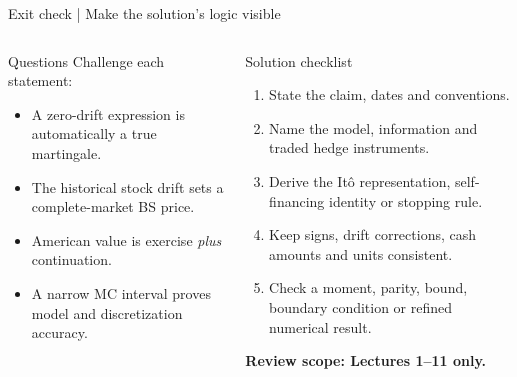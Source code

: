 \documentclass[handout,10pt,t,aspectratio=169]{beamer}
\newenvironment{questions}{\begin{block}{Questions}}{\end{block}}
\newcommand{\compact}{\small%
 \setlength{\abovedisplayskip}{3pt}%
 \setlength{\belowdisplayskip}{3pt}%
 \setlength{\abovedisplayshortskip}{2pt}%
 \setlength{\belowdisplayshortskip}{2pt}%
 \setlength{\parskip}{2pt}}
\begin{document}
\begin{frame}{Exit check | Make the solution's logic visible}
\compact
\begin{columns}[T,onlytextwidth]
\begin{questions}
Challenge each statement:
\begin{itemize}
\item A zero-drift expression is automatically a true martingale.
\item The historical stock drift sets a complete-market BS price.
\item American value is exercise \emph{plus} continuation.
\item A narrow MC interval proves model and discretization accuracy.
\end{itemize}
\end{questions}
\begin{exampleblock}{Solution checklist}
\begin{enumerate}
\item State the claim, dates and conventions.
\item Name the model, information and traded hedge instruments.
\item Derive the It\^o representation, self-financing identity or stopping rule.
\item Keep signs, drift corrections, cash amounts and units consistent.
\item Check a moment, parity, bound, boundary condition or refined numerical result.
\end{enumerate}
\textbf{Review scope: Lectures 1--11 only.}
\end{exampleblock}
\end{columns}
\end{frame}
\end{document}
